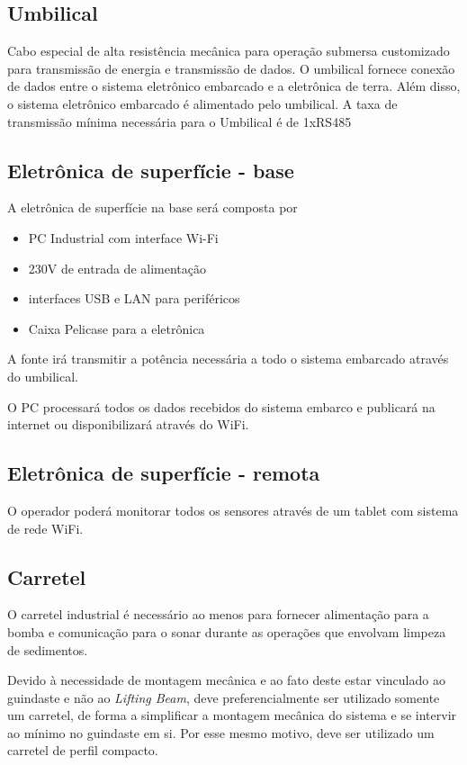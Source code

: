 \subsection{Umbilical}

Cabo especial  de alta resistência mecânica para operação submersa customizado para transmissão de energia e transmissão de dados. O umbilical fornece conexão de dados entre o sistema eletrônico embarcado e a eletrônica de terra. Além disso, o sistema eletrônico embarcado é alimentado pelo umbilical. A taxa de transmissão mínima necessária para o Umbilical é de 1xRS485 

\subsection{Eletrônica de superfície - base}

A eletrônica de superfície na base será composta por

\begin{itemize}
	\item PC Industrial com interface Wi-Fi
	\item 230V de entrada de alimentação 
	\item interfaces USB e LAN para periféricos 
	\item Caixa Pelicase para a eletrônica
\end{itemize}

A fonte irá transmitir a potência necessária a todo o sistema embarcado
através do umbilical.

O PC processará todos os dados recebidos do sistema embarco e publicará na
internet ou disponibilizará através do WiFi.

\subsection{Eletrônica de superfície - remota}
O operador poderá monitorar todos os sensores através de um tablet com sistema
de rede WiFi. 

\subsection{Carretel}
O carretel industrial é necessário ao menos para fornecer alimentação para a
bomba e comunicação para o sonar durante as operações que envolvam limpeza de
sedimentos.
 
Devido à necessidade de montagem mecânica e ao fato deste estar vinculado ao
guindaste e não ao \textit{Lifting Beam}, deve preferencialmente ser utilizado
somente um carretel, de forma a simplificar a montagem mecânica do sistema e se
intervir ao mínimo no guindaste em si. Por esse mesmo motivo, deve ser utilizado
um carretel de perfil compacto.
 
